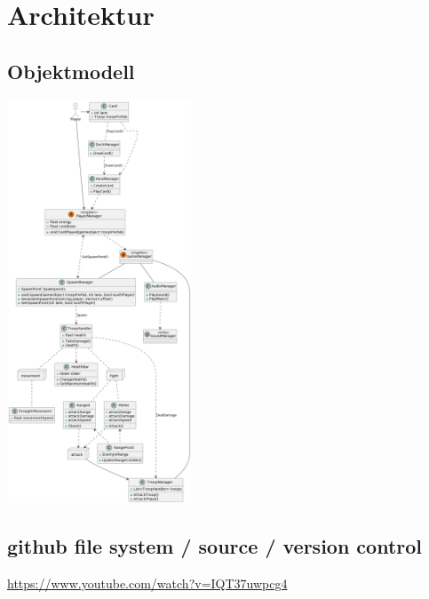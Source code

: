 \chapter{Architektur}

\section{Objektmodell}
\includegraphics[height=12cm]{resources/bla.png}


\section*{github file system / source / version control}
\url{https://www.youtube.com/watch?v=IQT37uwpcg4}